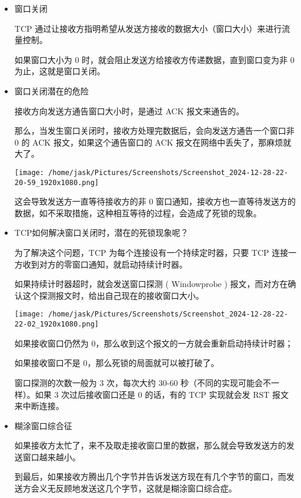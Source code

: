 \documentclass[11pt]{article}
\begin{document}
\begin{itemize}
\item 窗口关闭

TCP 通过让接收方指明希望从发送方接收的数据大小（窗口大小）来进行流量控制。

如果窗口大小为 0 时，就会阻止发送方给接收方传递数据，直到窗口变为非 0 为止，这就是窗口关闭。

\item 窗口关闭潜在的危险

接收方向发送方通告窗口大小时，是通过 ACK 报文来通告的。

那么，当发生窗口关闭时，接收方处理完数据后，会向发送方通告一个窗口非 0 的 ACK 报文，如果这个通告窗口的 ACK 报文在网络中丢失了，那麻烦就大了。

\begin{center}
\texttt{[image: /home/jask/Pictures/Screenshots/Screenshot\_2024-12-28-22-20-59\_1920x1080.png]}
\end{center}

这会导致发送方一直等待接收方的非 0 窗口通知，接收方也一直等待发送方的数据，如不采取措施，这种相互等待的过程，会造成了死锁的现象。

\item TCP如何解决窗口关闭时，潜在的死锁现象呢？

为了解决这个问题，TCP 为每个连接设有一个持续定时器，只要 TCP 连接一方收到对方的零窗口通知，就启动持续计时器。

如果持续计时器超时，就会发送窗口探测 ( Windowprobe ) 报文，而对方在确认这个探测报文时，给出自己现在的接收窗口大小。

\begin{center}
\texttt{[image: /home/jask/Pictures/Screenshots/Screenshot\_2024-12-28-22-22-02\_1920x1080.png]}
\end{center}

如果接收窗口仍然为 0，那么收到这个报文的一方就会重新启动持续计时器；

如果接收窗口不是 0，那么死锁的局面就可以被打破了。

窗口探测的次数一般为 3 次，每次大约 30-60 秒（不同的实现可能会不一样）。如果 3 次过后接收窗口还是 0 的话，有的 TCP 实现就会发 RST 报文来中断连接。

\item 糊涂窗口综合征

如果接收方太忙了，来不及取走接收窗口里的数据，那么就会导致发送方的发送窗口越来越小。

到最后，如果接收方腾出几个字节并告诉发送方现在有几个字节的窗口，而发送方会义无反顾地发送这几个字节，这就是糊涂窗口综合症。


\end{itemize}
\end{document}
